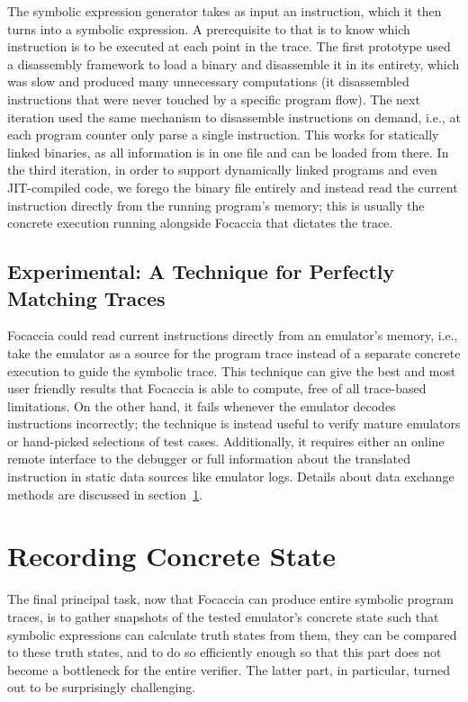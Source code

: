 The symbolic expression generator takes as input an instruction, which it then turns into a symbolic expression. A
prerequisite to that is to know which instruction is to be executed at each point in the trace. The first prototype used
a disassembly framework to load a binary and disassemble it in its entirety, which was slow and produced many
unnecessary computations (it disassembled instructions that were never touched by a specific program flow). The next
iteration used the same mechanism to disassemble instructions on demand, i.e., at each program counter only parse a
single instruction. This works for statically linked binaries, as all information is in one file and can be loaded from
there. In the third iteration, in order to support dynamically linked programs and even \ac{JIT}-compiled code, we
forego the binary file entirely and instead read the current instruction directly from the running program's memory;
this is usually the concrete execution running alongside Focaccia that dictates the trace.

\subsection{Experimental: A Technique for Perfectly Matching Traces}\label{sec:experimental_trace_match}

Focaccia could read current instructions directly from an emulator's memory, i.e., take the emulator as a source for the
program trace instead of a separate concrete execution to guide the symbolic trace. This technique can give the best and
most user friendly results that Focaccia is able to compute, free of all trace-based limitations. On the other hand, it
fails whenever the emulator decodes instructions incorrectly; the technique is instead useful to verify mature emulators
or hand-picked selections of test cases. Additionally, it requires either an online remote interface to the debugger or
full information about the translated instruction in static data sources like emulator logs. Details about data exchange
methods are discussed in section~\ref{sec:recording_state}.

\section{Recording Concrete State}\label{sec:recording_state}

The final principal task, now that Focaccia can produce entire symbolic program traces, is to gather snapshots of the
tested emulator's concrete state such that symbolic expressions can calculate truth states from them, they can be
compared to these truth states, and to do so efficiently enough so that this part does not become a bottleneck for the
entire verifier. The latter part, in particular, turned out to be surprisingly challenging.

